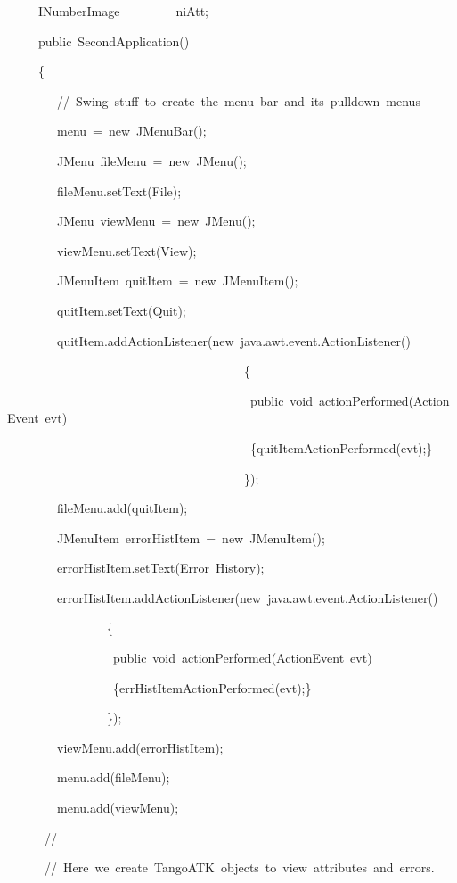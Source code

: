 \begin{lyxcode}
~~~~~INumberImage~~~~~~~~~niAtt;

~~~~~public~SecondApplication()

~~~~~\{

~~~~~~~~//~Swing~stuff~to~create~the~menu~bar~and~its~pulldown~menus

~~~~~~~~menu~=~new~JMenuBar();

~~~~~~~~JMenu~fileMenu~=~new~JMenu();

~~~~~~~~fileMenu.setText(\textquotedbl{}File\textquotedbl{});~~~

~~~~~~~~JMenu~viewMenu~=~new~JMenu();

~~~~~~~~viewMenu.setText(\textquotedbl{}View\textquotedbl{});

~~~~~~~~JMenuItem~quitItem~=~new~JMenuItem();

~~~~~~~~quitItem.setText(\textquotedbl{}Quit\textquotedbl{});

~~~~~~~~quitItem.addActionListener(new~java.awt.event.ActionListener()

~~~~~~~~~~~~~~~~~~~~~~~~~~~~~~~~~~~~~~\{~~~~~~~~~~~~~~~~~

~~~~~~~~~~~~~~~~~~~~~~~~~~~~~~~~~~~~~~~public~void~actionPerformed(ActionEvent~evt)

~~~~~~~~~~~~~~~~~~~~~~~~~~~~~~~~~~~~~~~\{quitItemActionPerformed(evt);\}

~~~~~~~~~~~~~~~~~~~~~~~~~~~~~~~~~~~~~~\});



~~~~~~~~fileMenu.add(quitItem);

~~~~~~~~JMenuItem~errorHistItem~=~new~JMenuItem();

~~~~~~~~errorHistItem.setText(\textquotedbl{}Error~History\textquotedbl{});

~~~~~~~~errorHistItem.addActionListener(new~java.awt.event.ActionListener()

~~~~~~~~~~~~~~~~\{~~~~~~~~~~~~~~~~~

~~~~~~~~~~~~~~~~~public~void~actionPerformed(ActionEvent~evt)

~~~~~~~~~~~~~~~~~\{errHistItemActionPerformed(evt);\}

~~~~~~~~~~~~~~~~\});

~~~~~~~~viewMenu.add(errorHistItem);

~~~~~~~~menu.add(fileMenu);

~~~~~~~~menu.add(viewMenu);

~~~~~~//

~~~~~~//~Here~we~create~TangoATK~objects~to~view~attributes~and~errors.


\end{lyxcode}
